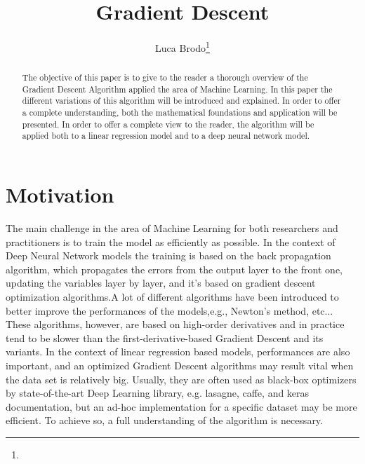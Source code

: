 \documentclass[english]{lni}
\begin{document}
\title[Gradient Descent]{Gradient Descent}
\author[Luca Brodo]{Luca Brodo\footnote{ } }

\maketitle
\tableofcontents
\begin{abstract}
The objective of this paper is to give to the reader a thorough overview of the Gradient Descent Algorithm applied the area of Machine Learning. In this paper the different variations of this algorithm will be introduced and explained. In order to offer a complete understanding, both the mathematical foundations and application will be presented. 
In order to offer a complete view to the reader, the algorithm will be applied both to a linear regression model and to a deep neural network model. 
\end{abstract}

\newpage

\section{Motivation}
The main challenge in the area of Machine Learning for both researchers and practitioners is to train the model as efficiently as possible. In the context of Deep Neural Network models the training is based on the back propagation algorithm, which propagates the errors from the output layer to the front one, updating the variables layer by layer, and it's based on gradient descent optimization algorithms.A lot of different algorithms have been introduced to better improve the performances of the models,e.g., Newton’s method, etc... These algorithms, however, are based on high-order derivatives and in practice tend to be slower than the first-derivative-based Gradient Descent and its variants. 
In the context of linear regression based models, performances are also important, and an optimized Gradient Descent algorithms may result vital when the data set is relatively big. Usually, they are often used as black-box optimizers by state-of-the-art Deep Learning library, e.g. lasagne, caffe, and keras documentation, but an ad-hoc implementation for a specific dataset may be more efficient. To achieve so, a full understanding of the algorithm is necessary. 
\end{document}
